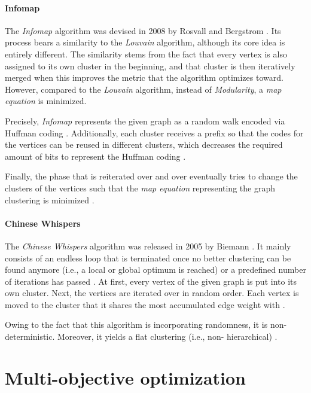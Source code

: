 \documentclass[12pt,a4paper]{report}
\begin{document}
\paragraph{Infomap \cite{rosvall2008infomap}}
The \textit{Infomap} algorithm
was devised in 2008 by Rosvall and Bergstrom \cite{rosvall2008infomap}. Its
process bears a similarity to the \textit{Louvain} algorithm, although its core
idea is entirely different. The similarity stems from the fact that every
vertex is also assigned to its own cluster in the beginning, and that cluster
is then iteratively merged when this improves the metric that the algorithm
optimizes toward. However, compared to the \textit{Louvain} algorithm, instead
of \textit{Modularity}, a \textit{map equation} is minimized.

Precisely, \textit{Infomap} represents the given graph as a random walk encoded
via Huffman coding \cite{huffman1952coding}. Additionally, each cluster
receives a prefix so that the codes for the vertices can be reused in different
clusters, which decreases the required amount of bits to represent the Huffman
coding \cite{rosvall2008infomap}.

Finally, the phase that is reiterated over and over eventually tries to change
the clusters of the vertices such that the \textit{map equation} representing
the graph clustering is minimized \cite{rosvall2008infomap}.

\paragraph{Chinese Whispers \cite{biemann2006chinese}}
The \textit{Chinese Whispers} algorithm was released in 2005 by Biemann
\cite{biemann2006chinese}.
It mainly consists of an endless loop that is terminated once no better
clustering can be found anymore (i.e., a local or global optimum is reached) or
a predefined number of iterations has passed \cite{biemann2006chinese}. At
first, every vertex of the given graph is put into its own cluster. Next, the
vertices are iterated over in random order. Each vertex is moved to the cluster
that it shares the most accumulated edge weight with \cite{biemann2006chinese}.

Owing to the fact that this algorithm is incorporating randomness, it is
non\hyp deterministic. Moreover, it yields a flat clustering (i.e., non\hyp
hierarchical) \cite{biemann2006chinese}.



\section{Multi-objective optimization}
\end{document}
